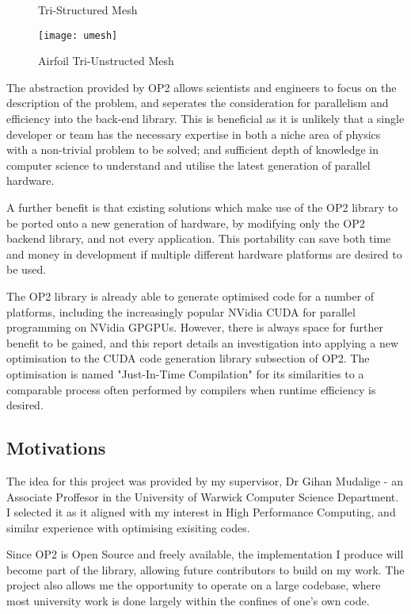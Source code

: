 \begin{figure}[h!]
  \begin{minipage}{.5\textwidth}
    \centering
    \caption{Tri-Structured Mesh}
    \label{fig:struct}
  \end{minipage}
  \begin{minipage}{.5\textwidth}
    \centering
    \texttt{[image: umesh]}
    \caption{Airfoil Tri-Unstructed Mesh}
    \label{fig:umesh}
  \end{minipage}
\end{figure}
\par
The abstraction provided by OP2 allows scientists and engineers to focus on the description of the problem, and seperates the consideration for parallelism and efficiency into the back-end library.
This is beneficial as it is unlikely that a single developer or team has the necessary expertise in both a niche area of physics with a non-trivial problem to be solved; and sufficient depth of knowledge in computer science to understand and utilise the latest generation of parallel hardware.
\par
A further benefit is that existing solutions which make use of the OP2 library to be ported onto a new generation of hardware, by modifying only the OP2 backend library, and not every application. This portability can save both time and money in development if multiple different hardware platforms are desired to be used.
\par
The OP2 library is already able to generate optimised code for a number of platforms, including the increasingly popular NVidia CUDA for parallel programming on NVidia GPGPUs. However, there is always space for further benefit to be gained, and this report details an investigation into applying a new optimisation to the CUDA code generation library subsection of OP2. The optimisation is named "Just-In-Time Compilation" for its similarities to a comparable process often performed by compilers when runtime efficiency is desired.

\subsection{Motivations}
The idea for this project was provided by my supervisor, Dr Gihan Mudalige - an Associate Proffesor in the University of Warwick Computer Science Department. I selected it as it aligned with my interest in High Performance Computing, and similar experience with optimising exisiting codes.
\par
Since OP2 is Open Source and freely available, the implementation I produce will become part of the library, allowing future contributors to build on my work. The project also allows me the opportunity to operate on a large codebase, where most university work is done largely within the confines of one's own code.

